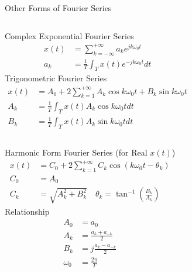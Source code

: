 \begin{frame}[plain]{Other Forms of Fourier Series}
    \begin{columns}
    Complex Exponential Fourier Series
            \begin{equation}
                \begin{aligned}
                    x(t) &= \sum_{k=-\infty}^{+\infty}a_k e^{jk\omega_0 t}\\
                    a_k &= \frac{1}{T} \int_{T}x(t)e^{-jk\omega_0 t}dt
                \end{aligned}
            \end{equation}
    Trigonometric Fourier Series
            \begin{equation}
                \begin{aligned}
                    x(t) &= A_0 + 2\sum_{k=1}^{+\infty} A_k\cos k\omega_0 t + B_k\sin k\omega_0 t\\
                    A_k &= \frac{1}{T} \int_{T}x(t)A_k\cos k\omega_0 t dt\\
                    B_k &= \frac{1}{T} \int_{T}x(t)A_k\sin k\omega_0 t dt
                \end{aligned}
            \end{equation}
    \end{columns}

    \begin{columns}
    Harmonic Form  Fourier Series (for Real $x(t)$)
            \begin{equation}
                \begin{aligned}
                    x(t) &= C_0 + 2\sum_{k=1}^{+\infty} C_k\cos (k\omega_0 t - \theta_k)\\
                    C_0 &= A_0\\
                    C_k &= \sqrt{A_k^2 + B_k^2} \quad                     \theta_k = \tan^{-1}\left(\frac{B_k}{A_k}\right)
                \end{aligned}
            \end{equation}
    Relationship
        \begin{equation}
            \begin{aligned}
                A_0 &= a_0\\
                A_k &= \frac{a_k + a_{-k}}{2}\\
                B_k &= j\frac{a_k - a_{-k}}{2}\\
                \omega_0 &= \frac{2\pi}{T}
            \end{aligned}
        \end{equation}
    \end{columns}




\end{frame}


